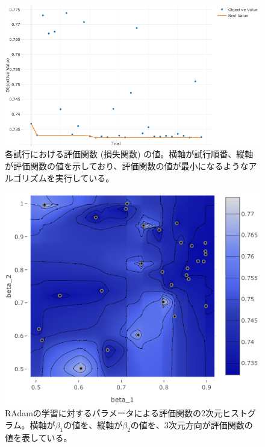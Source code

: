 \begin{figure}[H]
	\begin{center}
 \includegraphics[keepaspectratio, scale=0.3]
 	{Figure/Flavortagging/bays1.png}
 		\caption[各試行における評価関数の値]{各試行における評価関数 (損失関数) の値。横軸が試行順番、縦軸が評価関数の値を示しており、評価関数の値が最小になるようなアルゴリズムを実行している。}
 		\label{dnnbayes1}
	\end{center}
\end{figure}
\begin{figure}[H]
	\begin{center}
 \includegraphics[keepaspectratio, scale=0.3]
 	{Figure/Flavortagging/bays2.png}
 		\caption{RAdamの学習に対するパラメータによる評価関数の2次元ヒストグラム。横軸が$\beta_1$の値を、縦軸が$\beta_2$の値を、3次元方向が評価関数の値を表している。}
 		\label{dnnbayes2}
	\end{center}
\end{figure}
